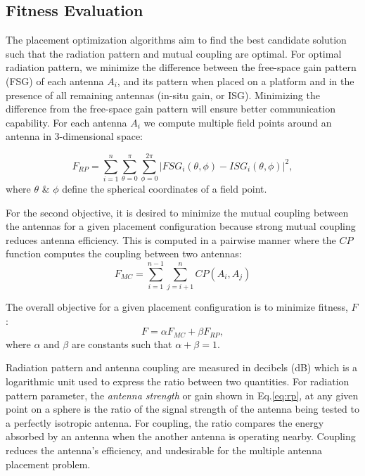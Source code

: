 \documentclass[conference]{IEEEtran}
\begin{document}
\subsection{Fitness Evaluation}
The placement optimization algorithms aim to find the best candidate solution such that the radiation pattern and mutual coupling are optimal. For optimal radiation pattern, we minimize the difference between the free-space gain pattern (FSG) of each antenna $A_i$, and its pattern when placed on a platform and in the presence of all remaining antennas (in-situ gain, or ISG). Minimizing the difference from the free-space gain pattern will ensure better communication capability. For each antenna $A_i$ we compute multiple field points around an antenna in 3-dimensional space:

\begin{equation} \label{eq:rp}
    F_{RP} = \sum_{i=1}^n\sum_{\theta=0}^\pi\sum_{\phi=0}^{2\pi}
           \left| FSG_i(\theta,\phi) - ISG_i(\theta,\phi) \right| ^2,
\end{equation}
where $\theta$ \& $\phi$ define the spherical coordinates of a field point.

For the second objective, it is desired to minimize the mutual coupling between the antennas for a given placement configuration because strong mutual coupling reduces antenna efficiency. This is computed in a pairwise manner where the $CP$ function computes the coupling between two antennas:
\begin{equation}
  F_{MC} = \sum_{i=1}^{n-1}\sum_{j=i+1}^{n} CP(A_i, A_j)
\end{equation}

The overall objective for a given placement configuration is to minimize fitness, $F$:
\begin{equation} \label{eq:optimal}
  F = \alpha F_{MC} + \beta F_{RP},
\end{equation}
where $\alpha$ and $\beta$ are constants such that $\alpha + \beta = 1$.

Radiation pattern and antenna coupling are measured in decibels (dB) which is a logarithmic unit used to express the ratio between two quantities. For radiation pattern parameter, the \textit{antenna strength} or gain shown in Eq.\eqref{eq:rp}, at any given point on a sphere is the ratio of the signal strength of the antenna being tested to a perfectly isotropic antenna. For coupling, the ratio compares the energy absorbed by an antenna when the another antenna is operating nearby. Coupling reduces the antenna's efficiency, and undesirable for the multiple antenna placement problem.
\end{document}

